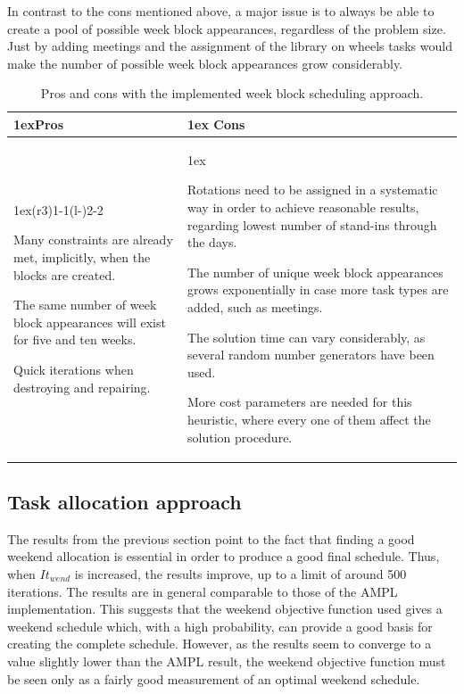 In contrast to the cons mentioned above, a major issue is to always be able to create a pool of possible week block appearances, regardless of the problem size. Just by adding meetings and the assignment of the library on wheels tasks would make the number of possible week block appearances grow considerably.

\begin{table}[H]
\caption{Pros and cons with the implemented week block scheduling approach.}
\label{tab:pros_cons_weekly_scheduling}
\begin{tabularx}{\linewidth}{>{\parskip1ex}X@{\kern4\tabcolsep}>{\parskip1ex}X}
\toprule
\hfil\bfseries Pros
&
\hfil\bfseries Cons
\\\cmidrule(r{3\tabcolsep}){1-1}\cmidrule(l{-\tabcolsep}){2-2}

Many constraints are already met, implicitly, when the blocks are created. \par
The same number of week block appearances will exist for five and ten weeks.\par
Quick iterations when destroying and repairing.\par

&

Rotations need to be assigned in a systematic way in order to achieve reasonable results, regarding lowest number of stand-ins through the days.\par
The number of unique week block appearances grows exponentially in case more task types are added, such as meetings.\par
The solution time can vary considerably, as several random number generators have been used.\par
More cost parameters are needed for this heuristic, where every one of them affect the solution procedure.

\\\bottomrule
\end{tabularx}
\end{table}

 

\subsection{Task allocation approach}
The results from the previous section point to the fact that finding a good weekend allocation is essential in order to produce a good final schedule. Thus, when $It_{wend}$ is increased, the results improve, up to a limit of around 500 iterations. The results are in general comparable to those of the AMPL implementation. This suggests that the weekend objective function used gives a weekend schedule which, with a high probability, can provide a good basis for creating the complete schedule. However, as the results seem to converge to a value slightly lower than the AMPL result, the weekend objective function must be seen only as a fairly good measurement of an optimal weekend schedule. 


